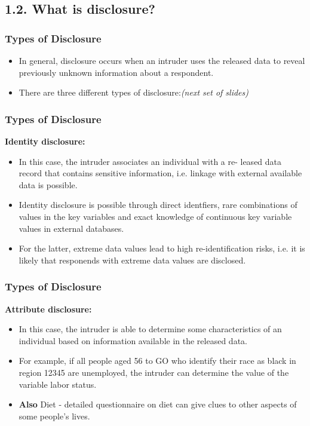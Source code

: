 \documentclass{beamer}
\begin{document}
\subsection*{1.2. What is disclosure?}
\begin{frame}
\frametitle{Types of Disclosure}

\begin{itemize}
\item In general, disclosure occurs when an intruder uses the released data to reveal
previously unknown information about a respondent.
\item There are three different types of disclosure:\textit{(next set of slides)}
\end{itemize}


\end{frame}
\begin{frame}
	\frametitle{Types of Disclosure}

\textbf{Identity disclosure:}
\begin{itemize}
	\item In this case, the intruder associates an individual with a re-
	leased data record that contains sensitive information, i.e. linkage with external available data is possible.
	\item Identity disclosure is possible through direct
	identfiers, rare combinations of values in the key variables and exact knowledge of continuous key variable values in external databases. 
	\item For the latter,
	extreme data values 
	lead to high re-identification risks, i.e. it is likely that responends with extreme data values are disclosed.
\end{itemize}
\end{frame}
\begin{frame}
	\frametitle{Types of Disclosure}
\textbf{Attribute disclosure:}
\begin{itemize}
	
	\item In this case, the intruder is able to determine some characteristics of an individual based on information available in the released data.
	\item For example, if all people aged 56 to GO who identify their race as black in
	region 12345 are unemployed, the intruder can determine the value of the
	variable labor status.
	\item \textbf{Also} Diet - detailed questionnaire on diet can give clues to other aspects of some people's lives.
\end{itemize}
\end{frame}
\end{document}
